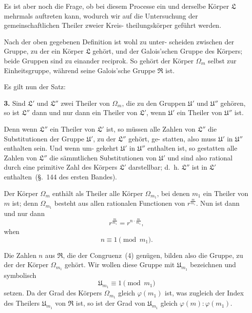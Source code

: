 \documentclass[12pt,a4paper]{article}
\theoremstyle{plain}
\theoremstyle{definition}
\theoremstyle{remark}
\begin{document}
Es ist aber noch die Frage, ob bei diesem Processe ein und
derselbe Körper $\mathfrak{L}$ mehrmals auftreten kann, wodurch wir auf
die Untersuchung der gemeinschaftlichen Theiler zweier Kreis-
theilungskörper geführt werden.

Nach der oben gegebenen Definition ist wohl zu unter-
scheiden zwischen der Gruppe, zu der ein Körper $\mathfrak{L}$ gehört,
und der Galois'schen Gruppe des Körpers; beide Gruppen sind
zu einander reciprok. So gehört der Körper $\Omega_m$ selbst zur
Einheitsgruppe, während seine Galois'sche Gruppe $\mathfrak{R}$ ist.

Es gilt nun der Satz:

\textbf{3.} Sind $\mathfrak{L}'$ und $\mathfrak{L}''$ zwei Theiler von $\Omega_m$, die zu den
Gruppen $\mathfrak{U}'$ und $\mathfrak{U}''$ gehören, so ist $\mathfrak{L}''$ dann und
nur dann ein Theiler von $\mathfrak{L}'$, wenn $\mathfrak{U}'$ ein Theiler
von $\mathfrak{U}''$ ist.

Denn wenn $\mathfrak{L}''$ ein Theiler von $\mathfrak{L}'$ ist, so müssen alle Zahlen
von $\mathfrak{L}''$ die Substitutionen der Gruppe $\mathfrak{U}'$, zu der $\mathfrak{L}''$ gehört, ge-
statten, also muss $\mathfrak{U}'$ in $\mathfrak{U}''$ enthalten sein. Und wenn um-
gekehrt $\mathfrak{U}'$ in $\mathfrak{U}''$ enthalten ist, so gestatten alle Zahlen von $\mathfrak{L}''$
die sämmtlichen Substitutionen von $\mathfrak{U}'$ und sind also rational
durch eine primitive Zahl des Körpers $\mathfrak{L}'$ darstellbar; d.~h. $\mathfrak{L}''$
ist in $\mathfrak{L}'$ enthalten~(\S.~144 des ersten Bandes).

Der Körper $\Omega_m$ enthält als Theiler alle Körper $\Omega_{m_1}$, bei
denen $m_1$ ein Theiler von $m$ ist; denn $\Omega_{m_1}$ besteht aus allen
rationalen Functionen von $r^{\frac{m}{m_1}}$. Nun ist dann und nur dann
\[
r^{\frac{m}{m_1}} = r^{n \cdot \frac{m}{m_1}},
\]
when
\begin{equation}\tag{4}
n \equiv 1 \pmod{m_1}.
\end{equation}

Die Zahlen $n$ aus $\mathfrak{R}$, die der Congruenz~(4) genügen, bilden
also die Gruppe, zu der der Körper $\Omega_{m_1}$ gehört. Wir wollen
diese Gruppe mit $\mathfrak{U}_{m_1}$ bezeichnen und symbolisch
\begin{equation}\tag{5}
\mathfrak{U}_{m_1} \equiv 1 \pmod{m_1}
\end{equation}
setzen. Da der Grad des Körpers $\Omega_{m_1}$ gleich $\varphi(m_1)$ ist, was
zugleich der Index des Theilers $\mathfrak{U}_{m_1}$ von $\mathfrak{R}$ ist, so ist der Grad
von $\mathfrak{U}_{m_1}$ gleich $\varphi(m) : \varphi(m_1)$.
\end{document}
